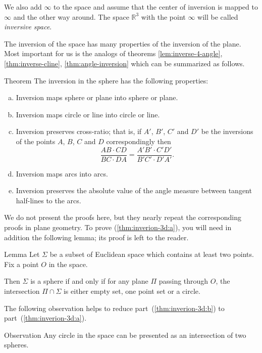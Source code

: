 We also add $\infty$ to the space and assume that the center of inversion is mapped to $\infty$ and the other way around. 
The space $\mathbb{R}^3$ with the point $\infty$ will be called \emph{inversive space}.

The inversion of the space 
has many properties 
of the inversion of the plane.
Most important for us is the analogs of theorems \ref{lem:inverse-4-angle}, \ref{thm:inverse-cline}, \ref{thm:angle-inversion} which can be summarized as follows.

\begin{thm}{Theorem}\label{thm:inverion-3d}
The inversion in the sphere has the following properties:
\begin{enumerate}[(a)]
\item\label{thm:inverion-3d:a} Inversion maps sphere or plane into sphere or plane.
\item\label{thm:inverion-3d:b} Inversion maps circle or line into circle or line. 
\item\label{thm:inverion-3d:cross-ratio} Inversion preserves cross-ratio; that is, if $A'$, $B'$, $C'$ and $D'$ be the inversions of the points $A$, $B$, $C$ and $D$ correspondingly 
then
$$\frac{AB\cdot CD}{BC\cdot DA}= \frac{A'B'\cdot C'D'}{B'C'\cdot D'A'}.$$
\item Inversion maps arcs into arcs.
\item\label{thm:inverion-3d:angle} Inversion preserves the absolute value of the angle
measure between tangent half-lines to the arcs.
\end{enumerate}
\end{thm}


We do not present the proofs here, but
they nearly repeat the corresponding proofs in plane geometry.
To prove (\ref{thm:inverion-3d:a}), you will need in addition the following lemma;
its proof is left to the reader.

\begin{thm}{Lemma}
Let $\Sigma$ be a subset of Euclidean space
which contains at least two points.
Fix a point $O$ in the space.

Then $\Sigma$ is 
a sphere 
if and only if
for any plane $\Pi$ passing through $O$,
the intersection $\Pi\cap \Sigma$ is either empty set,
one point set or a circle.
\end{thm}  

The following observation helps to reduce part~(\ref{thm:inverion-3d:b}) to part~(\ref{thm:inverion-3d:a}).

\begin{thm}{Observation}
Any circle in the space can be presented as an intersection of two spheres.
\end{thm}


